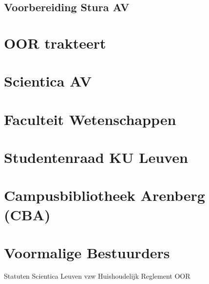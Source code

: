 \documentclass[a4paper,11pt]{article}
\begin{document}
		\subsection{Voorbereiding Stura AV}
	
	\section{OOR trakteert}
	
	\section{Scientica AV}
	
	\section{Faculteit Wetenschappen}
	
	\section{Studentenraad KU Leuven}
	\label{stura}
	
	\section{Campusbibliotheek Arenberg (CBA)}
	
	\section{Voormalige Bestuurders}
	
	\begin{thebibliography}{9}
		Statuten Scientica Leuven vzw
		Huishoudelijk Reglement OOR
	\end{thebibliography}
	
	
	
\end{document}
